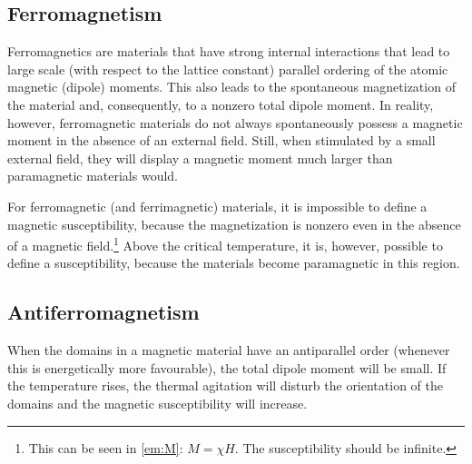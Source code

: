 \subsection{Ferromagnetism}

    Ferromagnetics are materials that have strong internal interactions that lead to large scale (with respect to the lattice constant) parallel ordering of the atomic magnetic (dipole) moments. This also leads to the spontaneous magnetization of the material and, consequently, to a nonzero total dipole moment. In reality, however, ferromagnetic materials do not always spontaneously possess a magnetic moment in the absence of an external field. Still, when stimulated by a small external field, they will display a magnetic moment much larger than paramagnetic materials would.



    \begin{remark}
        For ferromagnetic (and ferrimagnetic) materials, it is impossible to define a magnetic susceptibility, because the magnetization is nonzero even in the absence of a magnetic field.\footnote{This can be seen in \cref{em:M}: $M=\chi H$. The susceptibility should be infinite.} Above the critical temperature, it is, however, possible to define a susceptibility, because the materials become paramagnetic in this region.
    \end{remark}

\subsection{Antiferromagnetism}

    When the domains in a magnetic material have an antiparallel order (whenever this is energetically more favourable), the total dipole moment will be small. If the temperature rises, the thermal agitation will disturb the orientation of the domains and the magnetic susceptibility will increase.


